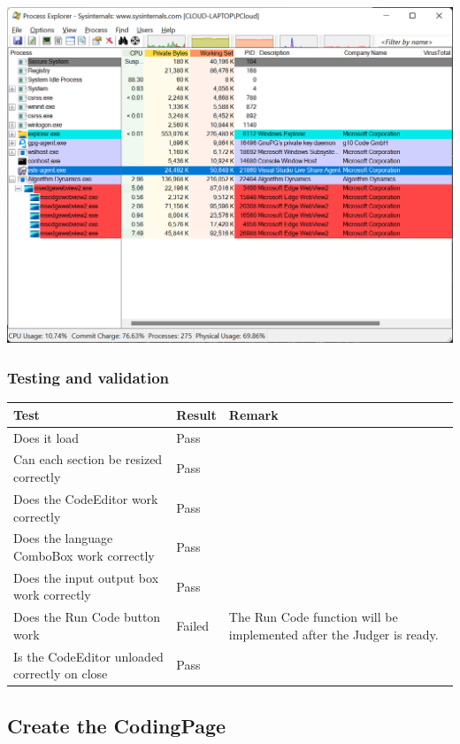 \documentclass[a4paper]{report}
\begin{document}
\includegraphics[width=\textwidth, height=\textheight, keepaspectratio]{Process-Explorer-WebView2-Destroyed}

\subsubsection{Testing and validation}

\begin{tabulary}{\linewidth}{|L|l|L|}
    \hline
    Test & Result & Remark \\
    \hline
    Does it load & Pass & \\
    \hline
    Can each section be resized correctly & Pass & \\
    \hline
    Does the CodeEditor work correctly & Pass & \\
    \hline
    Does the language ComboBox work correctly & Pass & \\
    \hline
    Does the input output box work correctly & Pass & \\
    \hline
    Does the Run Code button work & Failed & The Run Code function will be implemented after the Judger is ready. \\
    \hline
    Is the CodeEditor unloaded correctly on close & Pass & \\
    \hline
\end{tabulary}

\subsection{Create the CodingPage}
\end{document}
